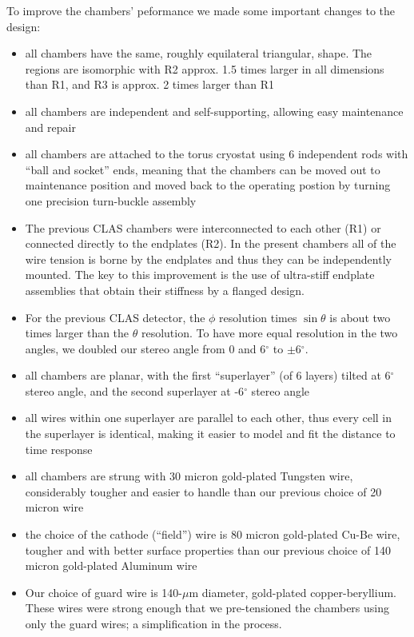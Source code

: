 To improve the chambers' peformance we made some important changes to the design:
\begin{itemize}
\item all chambers have the same, roughly equilateral triangular, shape.
The regions are isomorphic with R2 approx. 1.5 times larger
in all dimensions than R1, and R3 is approx. 2 times larger than R1
\item all chambers are independent and self-supporting, allowing easy
maintenance and repair
\item all chambers are attached to the torus cryostat using 6 independent
rods with ``ball and socket'' ends, meaning that the chambers can be
moved out to maintenance position and moved back to the operating 
postion by turning one precision turn-buckle assembly
\item The previous CLAS chambers were interconnected to each other (R1) or 
connected directly to the endplates (R2).  In the present chambers all of the wire tension
is borne by the endplates and thus they can be independently mounted.
The key to this improvement is the use of  
ultra-stiff endplate assemblies that obtain their stiffness 
by a flanged design.  
\item For the previous CLAS detector, the $\phi$ resolution times $\sin \theta$ is about two 
times larger than the $\theta$ resolution.  To have more equal resolution in 
the two angles, we doubled our stereo angle from 0 and 6$^\circ$ to 
$\pm$6$^\circ$.
\item all chambers are planar, with the first ``superlayer'' (of 6 layers)
tilted at 6$^\circ$ stereo angle, and the second superlayer at -6$^\circ$ stereo
angle
\item all wires within one superlayer are parallel to each other, thus
every cell in the superlayer is identical, making it easier to model
and fit the distance to time response
\item all chambers are strung with 30 micron gold-plated Tungsten wire,
considerably tougher and easier to handle than our previous choice 
of 20 micron wire
\item the choice of the cathode (``field'') wire is 80 micron gold-plated
Cu-Be wire, tougher and with better surface properties than our previous
choice of 140 micron gold-plated Aluminum wire
\item  Our choice of guard wire is 140-$\mu$m diameter, gold-plated
copper-beryllium.  These wires were strong enough that we pre-tensioned 
the chambers using only the guard wires; a simplification in the process.

\end{itemize}

